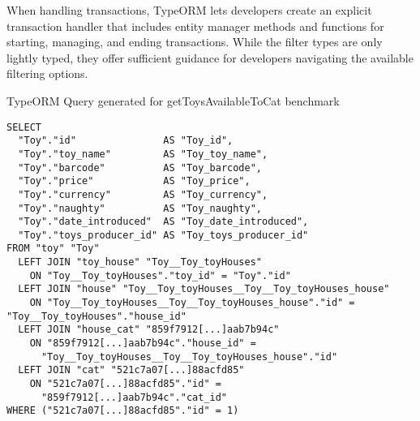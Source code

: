 When handling transactions, TypeORM lets developers create an explicit
transaction handler that includes entity manager methods and functions for
starting, managing, and ending transactions. While the filter types are only
lightly typed, they offer sufficient guidance for developers navigating the
available filtering options.

\begin{listing}
  \caption{TypeORM Query generated for getToysAvailableToCat benchmark}
  \label{lst:typeorm-query}
\begin{verbatim}
SELECT 
  "Toy"."id"               AS "Toy_id",
  "Toy"."toy_name"         AS "Toy_toy_name",
  "Toy"."barcode"          AS "Toy_barcode",
  "Toy"."price"            AS "Toy_price",
  "Toy"."currency"         AS "Toy_currency",
  "Toy"."naughty"          AS "Toy_naughty",
  "Toy"."date_introduced"  AS "Toy_date_introduced",
  "Toy"."toys_producer_id" AS "Toy_toys_producer_id"
FROM "toy" "Toy"
  LEFT JOIN "toy_house" "Toy__Toy_toyHouses" 
    ON "Toy__Toy_toyHouses"."toy_id" = "Toy"."id"
  LEFT JOIN "house" "Toy__Toy_toyHouses__Toy__Toy_toyHouses_house"
    ON "Toy__Toy_toyHouses__Toy__Toy_toyHouses_house"."id" = "Toy__Toy_toyHouses"."house_id"
  LEFT JOIN "house_cat" "859f7912[...]aab7b94c"
    ON "859f7912[...]aab7b94c"."house_id" =
      "Toy__Toy_toyHouses__Toy__Toy_toyHouses_house"."id"
  LEFT JOIN "cat" "521c7a07[...]88acfd85"
    ON "521c7a07[...]88acfd85"."id" =
      "859f7912[...]aab7b94c"."cat_id"
WHERE ("521c7a07[...]88acfd85"."id" = 1)
\end{verbatim}
\end{listing}
